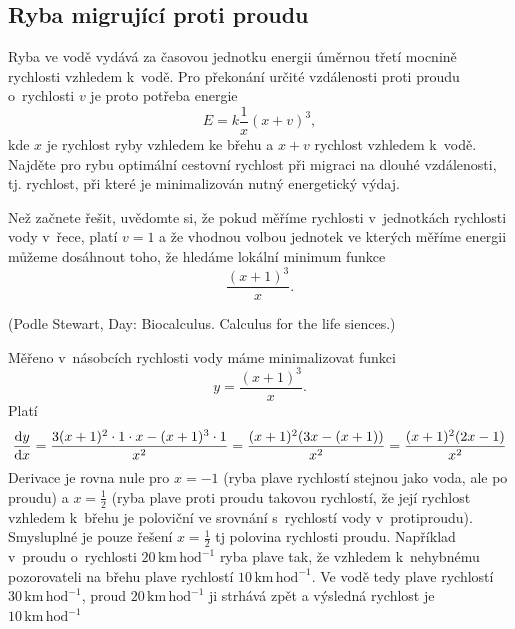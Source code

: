 {
\def\mezera{\vspace*{-20pt}}  \subsection{Ryba
  migrující proti proudu}  Ryba ve vodě vydává za časovou jednotku
energii úměrnou třetí mocnině rychlosti vzhledem k vodě. Pro překonání
určité vzdálenosti proti proudu o rychlosti $v$ je proto potřeba
energie $$E= k \frac 1x (x+v)^3,$$ kde $x$ je rychlost ryby vzhledem
ke břehu a $x+v$ rychlost vzhledem k vodě. Najděte pro rybu optimální
cestovní rychlost při migraci na dlouhé vzdálenosti, tj. rychlost, při
které je minimalizován nutný energetický výdaj.

{\footnotesize

Než začnete řešit, uvědomte si, že pokud měříme rychlosti v jednotkách rychlosti vody v řece, platí $v=1$ a že vhodnou volbou
jednotek ve kterých měříme energii můžeme dosáhnout toho, že hledáme lokální minimum funkce
\begin{equation*}
  \frac{(x+1)^3}x.
\end{equation*}



(Podle Stewart, Day: Biocalculus. Calculus for the life siences.)

}

\reseni
Měřeno v násobcích rychlosti vody máme minimalizovat funkci
\begin{equation*}
  y=\frac{(x+1)^3}x.
\end{equation*}
Platí
\begin{equation*}
  \frac{\mathrm{d}y}{\mathrm{d}x}=\frac{3(x+1)^2\cdot 1\cdot x-(x+1)^3\cdot 1}{x^2}=\frac{(x+1)^2(3x-(x+1))}{x^2}=\frac{(x+1)^2(2x-1)}{x^2}
\end{equation*}
Derivace je rovna nule pro $x=-1$ (ryba plave rychlostí stejnou jako voda, ale po proudu) a $x=\frac 12$ (ryba plave proti proudu takovou rychlostí, že její rychlost vzhledem k břehu je poloviční ve srovnání s rychlostí vody v protiproudu). Smysluplné je pouze řešení $x=\frac 12$ tj polovina rychlosti proudu. Například v proudu o rychlosti $20\,\mathrm{km}\,\mathrm{hod}^{-1}$ ryba plave tak, že vzhledem k nehybnému pozorovateli na břehu plave rychlostí $10\,\mathrm{km}\,\mathrm{hod}^{-1}$. Ve vodě tedy plave rychlostí $30\,\mathrm{km}\,\mathrm{hod}^{-1}$, proud $20\,\mathrm{km}\,\mathrm{hod}^{-1}$ ji strhává zpět a výsledná rychlost je $10\,\mathrm{km}\,\mathrm{hod}^{-1}$

\konec

}
\stranka

